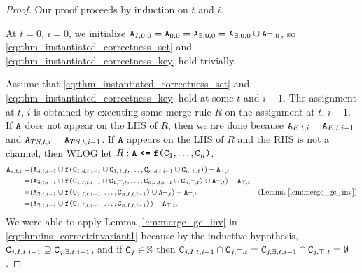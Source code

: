\begin{proof}
Our proof proceeds by induction on $t$ and $i$.

At $t=0$, $i=0$, we initialize $\tt{A}_{I,0,0} = \tt{A}_{0,0} = \tt{A}_{\exists,0,0} = \tt{A}_{\exists,0,0} \cup \tt{A}_{\top,0}$, so \eqref{eq:thm_instantiated_correctness_set} and \eqref{eq:thm_instantiated_correctness_key} hold trivially.

Assume that \eqref{eq:thm_instantiated_correctness_set} and \eqref{eq:thm_instantiated_correctness_key} hold at some $t$ and $i-1$.
The assignment at $t$, $i$ is obtained by executing some merge rule $R$ on the assignment at $t$, $i-1$.
If $\tt{A}$ does not appear on the LHS of $R$, then we are done because $\tt{A}_{E,t,i} = \tt{A}_{E,t,i-1}$ and $\tt{A}_{TS,t,i} = \tt{A}_{TS,t,i-1}$.
If $\tt{A}$ appears on the LHS of $R$ and the RHS is not a channel, then WLOG let $R: \tt{A} ~\tt{<=}~ \tt{f}\tt{(}\tt{C}_1, \dots, \tt{C}_n\tt{)}$.
\begin{align}
\tt{A}_{\exists,t,i}
=& (\tt{A}_{\exists,t,i-1} \cup \tt{f}\tt{(}\tt{C}_{1,\exists,t,i-1} \cup \tt{C}_{1,\top,t}, \dots, \tt{C}_{n,\exists,t,i-1} \cup \tt{C}_{n,\top,t}\tt{)}) - \tt{A}_{\top,t}\nonumber\\
=& (\tt{A}_{\exists,t,i-1} \cup \tt{f}\tt{(}\tt{C}_{1,I,t,i-1} \cup \tt{C}_{1,\top,t}, \dots, \tt{C}_{n,I,t,i-1} \cup \tt{C}_{n,\top,t}\tt{)} \cup \tt{A}_{\top,t}) - \tt{A}_{\top,t}\nonumber\\
=& (\tt{A}_{\exists,t,i-1} \cup \tt{f}\tt{(}\tt{C}_{1,I,t,i-1}, \dots, \tt{C}_{n,I,t,i-1}\tt{)} \cup \tt{A}_{\top,t}) - \tt{A}_{\top,t} & \text{(Lemma \ref{lem:merge_gc_inv})} \label{eq:thm:ins_correct:invariant1}\\
=& (\tt{A}_{\exists,t,i-1} \cup \tt{f}\tt{(}\tt{C}_{1,I,t,i-1}, \dots, \tt{C}_{n,I,t,i-1}\tt{)}) - \tt{A}_{\top,t}.\label{eq:thm:ins_correct:instant}
\end{align}
We were able to apply Lemma \ref{lem:merge_gc_inv} in \eqref{eq:thm:ins_correct:invariant1} because by the inductive hypothesis, $\tt{C}_{j,I,t,i-1} \supseteq \tt{C}_{j,\exists,t,i-1}$, and if $\tt{C}_j \in \mathbb{S}$ then $\tt{C}_{j,I,t,i-1} \cap \tt{C}_{j,\top,t} = \tt{C}_{j,\exists,t,i-1} \cap \tt{C}_{j,\top,t} = \emptyset$.


\end{proof}
